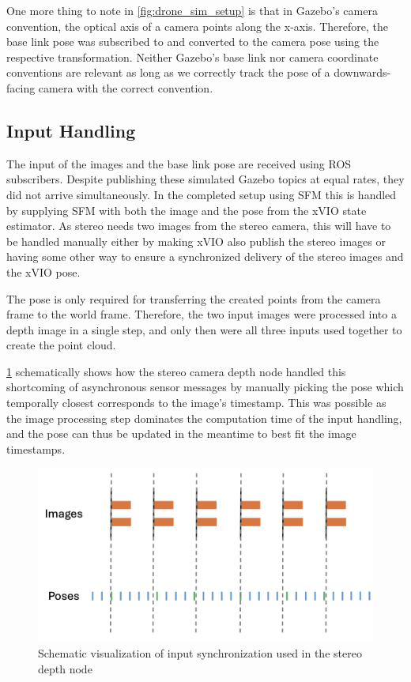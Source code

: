 One more thing to note in \cref{fig:drone_sim_setup} is that in Gazebo's camera convention, the optical axis of a camera points along the x-axis. Therefore, the base link pose was subscribed to and converted to the camera pose using the respective transformation. Neither Gazebo's base link nor camera coordinate conventions are relevant as long as we correctly track the pose of a downwards-facing camera with the correct convention.

\subsection{Input Handling}
The input of the images and the base link pose are received using ROS subscribers. Despite publishing these simulated Gazebo topics at equal rates, they did not arrive simultaneously. In the completed setup using SFM this is handled by supplying SFM with both the image and the pose from the xVIO state estimator. As stereo needs two images from the stereo camera, this will have to be handled manually either by making xVIO also publish the stereo images or having some other way to ensure a synchronized delivery of the stereo images and the xVIO pose.

The pose is only required for transferring the created points from the camera frame to the world frame. Therefore, the two input images were processed into a depth image in a single step, and only then were all three inputs used together to create the point cloud. 

\cref{fig:input_synch} schematically shows how the stereo camera depth node handled this shortcoming of asynchronous sensor messages by manually picking the pose which temporally closest corresponds to the image's timestamp. This was possible as the image processing step dominates the computation time of the input handling, and the pose can thus be updated in the meantime to best fit the image timestamps.

\clearpage %

\begin{figure}[h]
\centering
\includegraphics[scale=0.26]{images/stereo_camera_depth/input_synchronization.png}
\caption{Schematic visualization of input synchronization used in the stereo depth node}
\label{fig:input_synch}
\end{figure}

